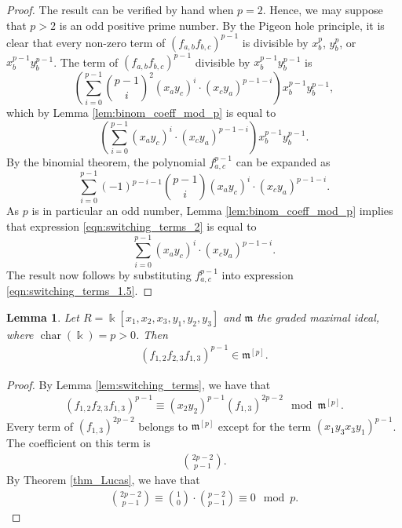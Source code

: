 \documentclass[12pt,a4paper]{amsart}
\theoremstyle{plain}
\newtheorem{lemma}[thrm]{Lemma}
\theoremstyle{definition}
\def\bproof{\begin{proof}}
\def\eproof{\end{proof}}
\theoremstyle{remark}
\def\k{\Bbbk}
\def\m{\mathfrak{m}}
\DeclareMathOperator{\fchar}{char}
\begin{document}
\bproof
The result can be verified by hand when $p = 2$. Hence, we may suppose that $p > 2$ is an odd positive prime number. By the Pigeon hole principle, it is clear that every non-zero term of $(f_{a,b}f_{b,c})^{p-1}$ is divisible by $x_b^{p}$, $y_b^{p}$, or $x_b^{p-1}y_b^{p-1}$. The term of $(f_{a,b}f_{b,c})^{p-1}$ divisible by $x_b^{p-1}y_b^{p-1}$ is
\begin{equation}
\label{eqn:switching_terms_1}
\left(\sum_{i=0}^{p-1} \binom{p-1}{i}^2 (x_ay_c)^i\cdot (x_cy_a)^{p-1-i}\right) x_b^{p-1}y_b^{p-1},
\end{equation}
which by Lemma \ref{lem:binom_coeff_mod_p} is equal to 
\begin{equation}
\label{eqn:switching_terms_1.5}
\left(\sum_{i=0}^{p-1} (x_ay_c)^i\cdot (x_cy_a)^{p-1-i}\right) x_b^{p-1}y_b^{p-1}.
\end{equation}
By the binomial theorem, the polynomial $f_{a,c}^{p-1}$ can be expanded as
\begin{equation}
\label{eqn:switching_terms_2}
    \sum_{i=0}^{p-1} (-1)^{p-i-1} \binom{p-1}{i} (x_ay_c)^i\cdot (x_cy_a)^{p-1-i}.
\end{equation}
As $p$ is in particular an odd number, Lemma \ref{lem:binom_coeff_mod_p} implies that expression \eqref{eqn:switching_terms_2} is equal to 
\begin{equation}
    \label{eqn:switching_terms_3}
    \sum_{i=0}^{p-1} (x_ay_c)^i\cdot (x_cy_a)^{p-1-i}.
\end{equation}
The result now follows by substituting $f_{a,c}^{p-1}$ into expression \eqref{eqn:switching_terms_1.5}.
\eproof

\begin{lemma}\label{lem:Lucas}
Let $R = \k[x_1,x_2,x_3,y_1,y_2,y_3]$ and $\m$ the graded maximal ideal, where $\fchar(\k) = p > 0$. Then
\begin{align*}
    (f_{1,2}f_{2,3}f_{1,3})^{p-1} \in \m^{[p]}.
\end{align*}
\end{lemma}

\begin{proof}
By Lemma \ref{lem:switching_terms}, we have that
\begin{align*}
    (f_{1,2}f_{2,3}f_{1,3})^{p-1} \equiv (x_2y_2)^{p-1} (f_{1,3})^{2p-2} \mod{\m^{[p]}}.
\end{align*}
Every term of $(f_{1,3})^{2p-2}$ belongs to $\m^{[p]}$ except for the term $(x_1y_3x_3y_1)^{p-1}$. The coefficient on this term is
\begin{align*}
    \binom{2p-2}{p-1}.
\end{align*}
By Theorem \ref{thm_Lucas}, we have that 
\begin{align*}
    \binom{2p-2}{p-1}  \equiv \binom{1}{0}\cdot \binom{p-2}{p-1} \equiv 0 \mod{p}.
\end{align*}
\end{proof}
\end{document}
